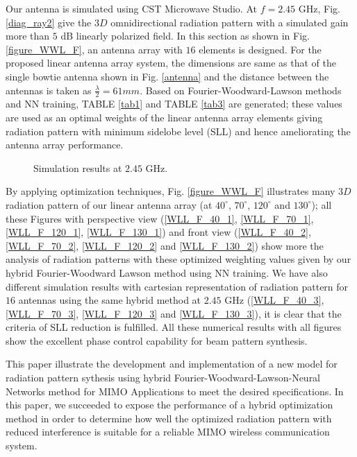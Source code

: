 \documentclass[conference]{IEEEtran}
\begin{document}
Our antenna is simulated using CST Microwave Studio. At $f=2.45$ GHz, Fig. \ref{diag_ray2} give the $3D$ omnidirectional radiation pattern with a simulated gain more than $5$ dB linearly polarized field. In this section as shown in Fig. \ref{figure_WWL_F}, an antenna array with $16$ elements is designed. For the proposed linear antenna array system, the dimensions are same as that of the single bowtie antenna shown in Fig. \ref{antenna} and the distance between the antennas is taken as $\frac{\lambda }{2}=61 mm$. Based on Fourier-Woodward-Lawson methods and NN training, TABLE \ref{tab1} and TABLE \ref{tab3} are generated; these values ​​are used as an optimal weights of the linear antenna array elements giving radiation pattern with minimum sidelobe level (SLL) and hence ameliorating the antenna array performance.
\begin{figure}[!ht] 
    \centering 
    \caption{Simulation results at $2.45$ GHz.} 
    \label{fig4} 
\end{figure}
 

 
By applying optimization techniques, Fig. \ref{figure_WWL_F} illustrates many $3D$ radiation pattern of our linear antenna array (at $40^{\circ}$, $70^{\circ}$, $120^{\circ}$ and $130^{\circ}$); all these Figures with perspective view (\ref{WLL_F_40_1}, \ref{WLL_F_70_1}, \ref{WLL_F_120_1}, \ref{WLL_F_130_1}) and front view (\ref{WLL_F_40_2}, \ref{WLL_F_70_2}, \ref{WLL_F_120_2} and \ref{WLL_F_130_2}) show more the analysis of radiation patterns with these ​​optimized weighting values given by our hybrid Fourier-Woodward Lawson method using NN training. We have also different simulation results with cartesian representation of radiation pattern for $16$ antennas using the same hybrid method at $2.45$ GHz (\ref{WLL_F_40_3}, \ref{WLL_F_70_3}, \ref{WLL_F_120_3} and \ref{WLL_F_130_3}), it is clear that the criteria of SLL reduction is fulfilled. All these numerical results with all figures show the excellent phase control capability for beam pattern synthesis.

This paper illustrate the development and implementation of a new model for radiation pattern sythesis using hybrid Fourier-Woodward-Lawson-Neural Networks method for MIMO Applications to meet the desired specifications. In this paper, we succeeded to expose the performance of a hybrid optimization method in order to determine how well the optimized radiation pattern with reduced interference is suitable for a reliable MIMO wireless communication system. 
\end{document}
